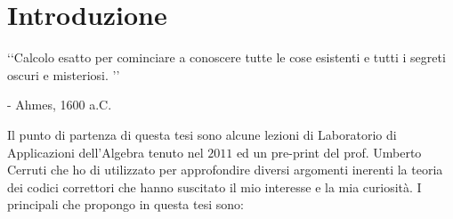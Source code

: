 

\chapter*{Introduzione}

\begin{flushright}
\lq\lq Calcolo esatto per cominciare a conoscere tutte le cose esistenti e tutti i segreti oscuri e misteriosi. \rq\rq 
\vspace*{0.3cm}

- Ahmes, 1600 a.C.
\end{flushright}

\vspace*{0.6cm}

Il punto di partenza di questa tesi sono alcune lezioni di Laboratorio di Applicazioni dell'Algebra tenuto nel $2011$ ed un pre-print del prof. Umberto Cerruti \cite{cerruti} che ho di utilizzato per approfondire diversi argomenti inerenti la teoria dei codici correttori che hanno suscitato il mio interesse e la mia curiosità. I principali che propongo in questa tesi sono:
